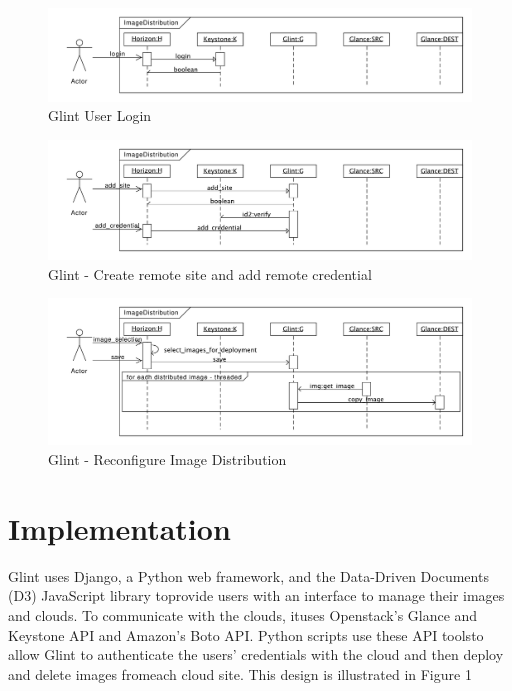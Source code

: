 \documentclass[a4paper]{jpconf}
\begin{document}
\begin{figure}[h]
\begin{center}
\includegraphics[width=36pc]{images/glintlogin.pdf}
\caption{\label{fig:glintlogin}Glint User Login}
\end{center}
\end{figure}

\begin{figure}[h]
\begin{center}
\includegraphics[width=36pc]{images/glintsitecred.pdf}
\caption{\label{fig:glintsitecred}Glint - Create remote site and add remote credential}
\end{center}
\end{figure}

\begin{figure}[h]
\begin{center}
\includegraphics[width=36pc]{images/glintdist.pdf}
\caption{\label{fig:glintdist}Glint - Reconfigure Image Distribution}
\end{center}
\end{figure}

\section{Implementation}

Glint uses Django, a Python web framework, and the Data-Driven Documents (D3) 
JavaScript library toprovide users with an interface to manage their images and clouds. 
To communicate with the clouds, ituses Openstack’s Glance and Keystone API and Amazon’s Boto API. 
Python scripts use these API toolsto allow Glint to authenticate the users’ credentials with the 
cloud and then deploy and delete images fromeach cloud site. 
This design is illustrated in Figure 1
\end{document}
